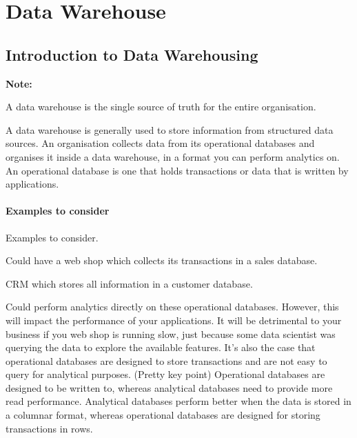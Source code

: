\documentclass[a4paper, 11pt]{book}
\newenvironment{note}{
    \begin{siderule}
        \textbf{Note: }
        }{
    \end{siderule}}
\begin{document}


    \section{Data Warehouse}

    \subsection{Introduction to Data Warehousing}

    \begin{note}
        A data warehouse is the single source of truth for the entire organisation.
    \end{note}

    A data warehouse is generally used to store information from structured data sources.
    An organisation collects data from its operational databases and organises it inside a data warehouse, in a format you can perform analytics on.
    An operational database is one that holds transactions or data that is written by applications.

    \paragraph{Examples to consider}
    Examples to consider.
    \begin{item}
        \item Could have a web shop which collects its transactions in a sales database.
        \item CRM which stores all information in a customer database.
    \end{item}

    Could perform analytics directly on these operational databases.
    However, this will impact the performance of your applications.
    It will be detrimental to your business if you web shop is running slow, just because some data scientist was querying the data to explore the available features.
    It's also the case that operational databases are designed to store transactions and are not easy to query for analytical purposes. (Pretty key point)
    Operational databases are designed to be written to, whereas analytical databases need to provide more read performance.
    Analytical databases perform better when the data is stored in a columnar format, whereas operational databases are designed for storing transactions in rows.
\end{document}
